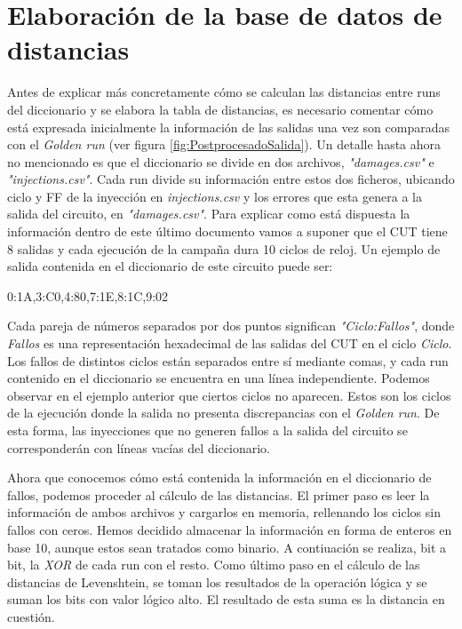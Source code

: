 \section{Elaboración de la base de datos de distancias}
\label{sec:LevenDist}
Antes de explicar más concretamente cómo se calculan las distancias entre runs del
diccionario y se elabora la tabla de distancias, es necesario comentar cómo está
expresada inicialmente la información de las salidas una vez son comparadas con el
\textit{Golden run} (ver figura \ref{fig:PostprocesadoSalida}). Un detalle hasta 
ahora no mencionado es que el diccionario se divide en dos archivos,
\textit{"damages.csv"} e \textit{"injections.csv"}. Cada run divide su información
entre estos dos ficheros, ubicando ciclo y \gls{FF} de la inyección en 
\textit{injections.csv} y los errores que esta genera a la salida del circuito, en
\textit{"damages.csv"}.
Para explicar como está dispuesta la información dentro de este último documento 
vamos a suponer que el \gls{CUT} tiene 8 salidas y cada ejecución de la campaña 
dura 10 ciclos de reloj. Un ejemplo de salida contenida en el diccionario de este
circuito puede ser:

\begin{center}
    0:1A,3:C0,4:80,7:1E,8:1C,9:02
\end{center}

Cada pareja de números separados por dos puntos significan
\textit{"Ciclo:Fallos"}, donde \textit{Fallos} es una representación hexadecimal
de las salidas del \gls{CUT} en el ciclo \textit{Ciclo}. Los fallos de distintos 
ciclos están separados entre sí mediante comas, y cada run contenido en el 
diccionario se encuentra en una línea independiente. Podemos observar en el 
ejemplo anterior que ciertos ciclos no aparecen. Estos son los ciclos de la 
ejecución donde la salida no presenta discrepancias con el \textit{Golden run}. 
De esta forma, las inyecciones que no generen fallos a la salida del circuito se 
corresponderán con líneas vacías del diccionario.

Ahora que conocemos cómo está contenida la información en el diccionario de
fallos, podemos proceder al cálculo de las distancias. El primer paso es leer la
información de ambos archivos y cargarlos en memoria, rellenando los ciclos sin
fallos con ceros. Hemos decidido almacenar la información en forma de enteros 
en base 10, aunque estos sean tratados como binario. A contiuación se realiza, bit
a bit, la \textit{XOR} de cada run con el resto. Como último paso en el cálculo de
las distancias de Levenshtein, se toman los resultados de la operación lógica y se
suman los bits con valor lógico alto. El resultado de esta suma es la distancia
en cuestión.

